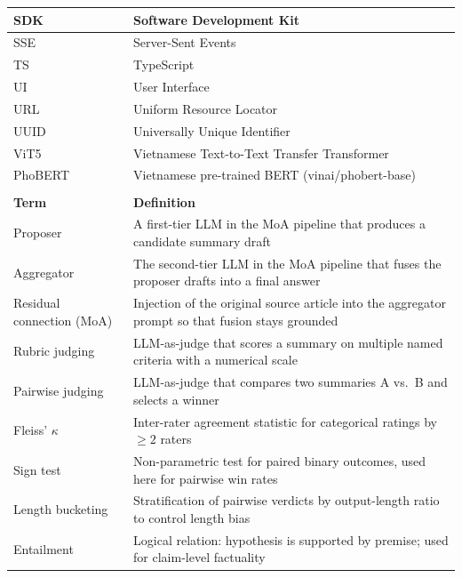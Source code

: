 \begin{longtable}{|>{\raggedright\arraybackslash}p{3.6cm}|>{\raggedright\arraybackslash}p{10.4cm}|}
  SDK   & Software Development Kit \\ \hline
  SSE   & Server-Sent Events \\ \hline
  TS    & TypeScript \\ \hline
  UI    & User Interface \\ \hline
  URL   & Uniform Resource Locator \\ \hline
  UUID  & Universally Unique Identifier \\ \hline
  ViT5  & Vietnamese Text-to-Text Transfer Transformer \\ \hline
  PhoBERT & Vietnamese pre-trained BERT (vinai/phobert-base) \\ \hline
  \multicolumn{2}{l}{} \\
  \hline
  \textbf{Term} & \textbf{Definition} \\ \hline
  Proposer    & A first-tier LLM in the MoA pipeline that produces a candidate summary draft \\ \hline
  Aggregator  & The second-tier LLM in the MoA pipeline that fuses the proposer drafts into a final answer \\ \hline
  Residual connection (MoA) & Injection of the original source article into the aggregator prompt so that fusion stays grounded \\ \hline
  Rubric judging   & LLM-as-judge that scores a summary on multiple named criteria with a numerical scale \\ \hline
  Pairwise judging & LLM-as-judge that compares two summaries A vs.\ B and selects a winner \\ \hline
  Fleiss' $\kappa$ & Inter-rater agreement statistic for categorical ratings by $\geq 2$ raters \\ \hline
  Sign test        & Non-parametric test for paired binary outcomes, used here for pairwise win rates \\ \hline
  Length bucketing & Stratification of pairwise verdicts by output-length ratio to control length bias \\ \hline
  Entailment       & Logical relation: hypothesis is supported by premise; used for claim-level factuality \\ \hline
\end{longtable}
